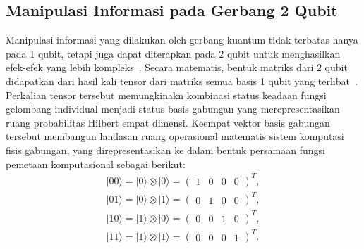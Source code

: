 \subsection{Manipulasi Informasi pada Gerbang 2 Qubit}
Manipulasi informasi yang dilakukan oleh gerbang kuantum tidak terbatas hanya pada 1 qubit, tetapi juga dapat diterapkan pada 2 qubit untuk menghasilkan efek-efek yang lebih kompleks~. Secara matematis, bentuk matriks dari 2 qubit didapatkan dari hasil kali tensor dari matriks semua basis 1 qubit yang terlibat~\cite{revythi_quantum_2025}. Perkalian tensor tersebut memungkinakn kombinasi status keadaan fungsi gelombang individual menjadi status basis gabungan yang merepresentasikan ruang probabilitas Hilbert empat dimensi. Keempat vektor basis gabungan tersebut membangun landasan ruang operasional matematis sistem komputasi fisis gabungan, yang direpresentasikan ke dalam bentuk persamaan fungsi pemetaan komputasional sebagai berikut:
\begin{equation}
    \label{eq:basis_2_qubit}
    \begin{split}
        |00\rangle = |0\rangle \otimes |0\rangle = \begin{pmatrix} 1 & 0 & 0 & 0 \end{pmatrix}^T, \\
        |01\rangle = |0\rangle \otimes |1\rangle = \begin{pmatrix} 0 & 1 & 0 & 0 \end{pmatrix}^T, \\
        |10\rangle = |1\rangle \otimes |0\rangle = \begin{pmatrix} 0 & 0 & 1 & 0 \end{pmatrix}^T, \\
        |11\rangle = |1\rangle \otimes |1\rangle = \begin{pmatrix} 0 & 0 & 0 & 1 \end{pmatrix}^T.
    \end{split}
\end{equation}

